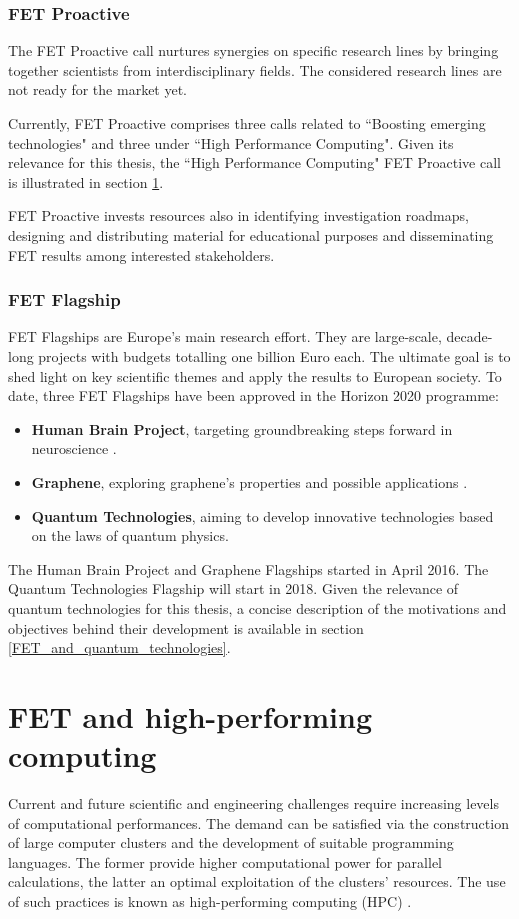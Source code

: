 \subsubsection{FET Proactive}
The FET Proactive call nurtures synergies on specific research lines by bringing together scientists from interdisciplinary fields. The considered research lines are not ready for the market yet.    

Currently, FET Proactive comprises three calls related to ``Boosting emerging technologies" and three under ``High Performance Computing". Given its relevance for this thesis, the ``High Performance Computing" FET Proactive call is illustrated in section \ref{FET_and_high-performing_computing}. 

FET Proactive invests resources also in identifying investigation roadmaps, designing and distributing material for educational purposes and disseminating FET results among interested stakeholders.  

\subsubsection{FET Flagship}
FET Flagships are Europe's main research effort. They are large-scale, decade-long projects with budgets totalling one billion Euro each. The ultimate goal is to shed light on key scientific themes and apply the results to European society. To date, three FET Flagships have been approved in the Horizon 2020 programme: 

\begin{itemize}
 \item \textbf{Human Brain Project}, targeting groundbreaking steps forward in neuroscience \cite{HBP}.
 \item \textbf{Graphene}, exploring graphene's properties and possible applications \cite{Graphene}.
 \item \textbf{Quantum Technologies}, aiming to develop innovative technologies based on the laws of quantum physics.
\end{itemize}
The Human Brain Project and Graphene Flagships started in April 2016. The Quantum Technologies Flagship will start in 2018. Given the relevance of quantum technologies for this thesis, a concise description of the motivations and objectives behind their development is available in section \ref{FET_and_quantum_technologies}.

\section{FET and high-performing computing} \label{FET_and_high-performing_computing}
Current and future scientific and engineering challenges require increasing levels of computational performances. The demand can be satisfied via the construction of large computer clusters and the development of suitable programming languages. The former provide higher computational power for parallel calculations, the latter an optimal exploitation of the clusters' resources. The use of such practices is known as high-performing computing (HPC) \cite{Hager}.


